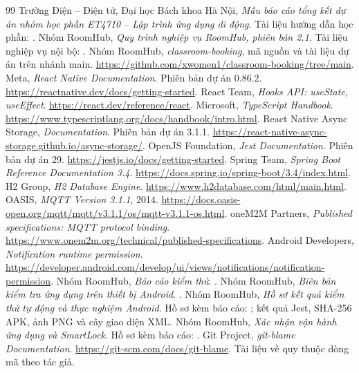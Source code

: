 \begin{thebibliography}{99}
\setlength{\itemsep}{1pt}
\setlength{\parskip}{0pt}
 Trường Điện -- Điện tử, Đại học Bách khoa Hà Nội, \textit{Mẫu báo cáo tổng kết dự án nhóm học phần ET4710 -- Lập trình ứng dụng di động}. Tài liệu hướng dẫn học phần: .
 Nhóm RoomHub, \textit{Quy trình nghiệp vụ RoomHub, phiên bản 2.1}. Tài liệu nghiệp vụ nội bộ: .
 Nhóm RoomHub, \textit{classroom-booking}, mã nguồn và tài liệu dự án trên nhánh main. \url{https://github.com/xwomen1/classroom-booking/tree/main}.
 Meta, \textit{React Native Documentation}. Phiên bản dự án 0.86.2. \url{https://reactnative.dev/docs/getting-started}.
 React Team, \textit{Hooks API: useState, useEffect}. \url{https://react.dev/reference/react}.
 Microsoft, \textit{TypeScript Handbook}. \url{https://www.typescriptlang.org/docs/handbook/intro.html}.
 React Native Async Storage, \textit{Documentation}. Phiên bản dự án 3.1.1. \url{https://react-native-async-storage.github.io/async-storage/}.
 OpenJS Foundation, \textit{Jest Documentation}. Phiên bản dự án 29. \url{https://jestjs.io/docs/getting-started}.
 Spring Team, \textit{Spring Boot Reference Documentation 3.4}. \url{https://docs.spring.io/spring-boot/3.4/index.html}.
 H2 Group, \textit{H2 Database Engine}. \url{https://www.h2database.com/html/main.html}.
 OASIS, \textit{MQTT Version 3.1.1}, 2014. \url{https://docs.oasis-open.org/mqtt/mqtt/v3.1.1/os/mqtt-v3.1.1-os.html}.
 oneM2M Partners, \textit{Published specifications: MQTT protocol binding}. \url{https://www.onem2m.org/technical/published-specifications}.
 Android Developers, \textit{Notification runtime permission}. \url{https://developer.android.com/develop/ui/views/notifications/notification-permission}.
 Nhóm RoomHub, \textit{Báo cáo kiểm thử}. .
 Nhóm RoomHub, \textit{Biên bản kiểm tra ứng dụng trên thiết bị Android}. .
 Nhóm RoomHub, \textit{Hồ sơ kết quả kiểm thử tự động và thực nghiệm Android}. Hồ sơ kèm báo cáo: ; kết quả Jest, SHA-256 APK, ảnh PNG và cây giao diện XML.
 Nhóm RoomHub, \textit{Xác nhận vận hành ứng dụng và SmartLock}. Hồ sơ kèm báo cáo: .
 Git Project, \textit{git-blame Documentation}. \url{https://git-scm.com/docs/git-blame}. Tài liệu về quy thuộc dòng mã theo tác giả.
\end{thebibliography}
